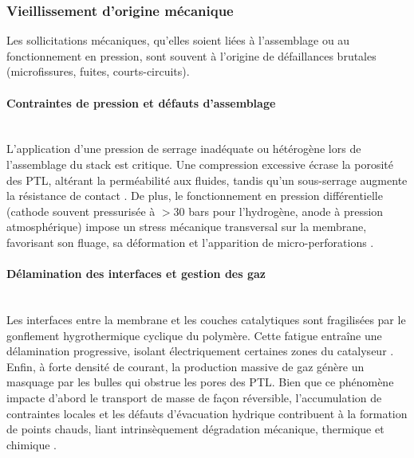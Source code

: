 \subsubsection{Vieillissement d'origine mécanique}

Les sollicitations mécaniques, qu'elles soient liées à l'assemblage ou au fonctionnement en pression, sont souvent à l'origine de défaillances brutales (microfissures, fuites, courts-circuits).

\paragraph{Contraintes de pression et défauts d'assemblage}\hfill \\
L'application d'une pression de serrage inadéquate ou hétérogène lors de l'assemblage du stack est critique. Une compression excessive écrase la porosité des PTL, altérant la perméabilité aux fluides, tandis qu'un sous-serrage augmente la résistance de contact \cite{lapicque_critical_2016}. De plus, le fonctionnement en pression différentielle (cathode souvent pressurisée à $>30$ bars pour l'hydrogène, anode à pression atmosphérique) impose un stress mécanique transversal sur la membrane, favorisant son fluage, sa déformation et l'apparition de micro-perforations \cite{khorasany_mechanical_2015}.

\paragraph{Délamination des interfaces et gestion des gaz}\hfill \\
Les interfaces entre la membrane et les couches catalytiques sont fragilisées par le gonflement hygrothermique cyclique du polymère. Cette fatigue entraîne une délamination progressive, isolant électriquement certaines zones du catalyseur \cite{qin_modeling_2021}. Enfin, à forte densité de courant, la production massive de gaz génère un masquage par les bulles qui obstrue les pores des PTL. Bien que ce phénomène impacte d'abord le transport de masse de façon réversible, l'accumulation de contraintes locales et les défauts d'évacuation hydrique contribuent à la formation de points chauds, liant intrinsèquement dégradation mécanique, thermique et chimique \cite{yuan_bubble_2023}\cite{maier_mass_2022}.

